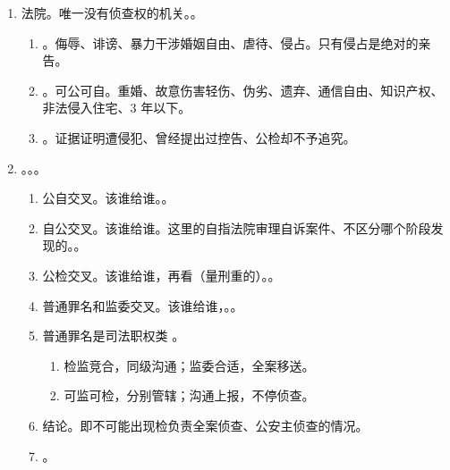 \begin{enumerate}
        \begin{enumerate}
          \item 公务员、法律法规授权、国企、公办科教文卫体、基层自治管理人员、其他履行公职的人员。
          \item {}。贪污贿赂、玩忽职守、滥用职权、徇私舞弊、重大责任事故、其他。
        \end{enumerate}
  \item 法院。唯一没有侦查权的机关。。
        \begin{enumerate}
          \item {}。侮辱、诽谤、暴力干涉婚姻自由、虐待、侵占。只有侵占是绝对的亲告。
          \item {}。可公可自。重婚、故意伤害轻伤、伪劣、遗弃、通信自由、知识产权、非法侵入住宅、3 年以下。
          \item {}。证据证明遭侵犯、曾经提出过控告、公检却不予追究。
        \end{enumerate}
  \item {}。。。
        \begin{enumerate}
          \item 公自交叉。该谁给谁。。
          \item 自公交叉。该谁给谁。这里的自指法院审理自诉案件、不区分哪个阶段发现的。。
          \item 公检交叉。该谁给谁，再看（量刑重的）。。
          \item 普通罪名和监委交叉。该谁给谁，。。
          \item 普通罪名是司法职权类 \xjt。
                \begin{enumerate}
                  \item 检监竞合，同级沟通；监委合适，全案移送。
                  \item 可监可检，分别管辖；沟通上报，不停侦查。
                \end{enumerate}
          \item 结论。即不可能出现检负责全案侦查、公安主侦查的情况。
          \item {}。
        \end{enumerate}

\end{enumerate}

